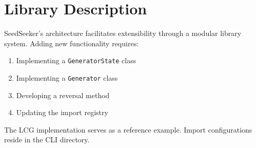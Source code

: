 \documentclass[12pt, a4paper]{report}
\begin{document}
\chapter{Library Description}
SeedSeeker's architecture facilitates extensibility through a modular library system. Adding new functionality requires:

\begin{enumerate}
    \item Implementing a \texttt{GeneratorState} class
    \item Implementing a \texttt{Generator} class
    \item Developing a reversal method
    \item Updating the import registry
\end{enumerate}

The LCG implementation serves as a reference example. Import configurations reside in the CLI directory.
\end{document}
